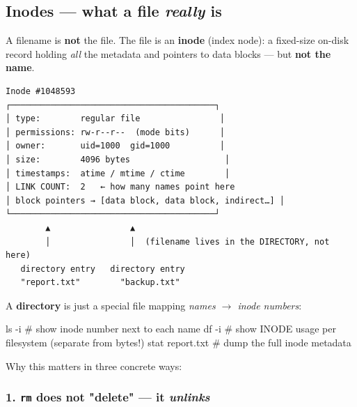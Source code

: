 \documentclass[11pt]{article}
\newenvironment{Shaded}{\begin{snugshade}}{\end{snugshade}}
\newcommand{\AttributeTok}[1]{\textcolor[rgb]{0.16,0.50,0.73}{#1}}
\newcommand{\CommentTok}[1]{\textcolor[rgb]{0.48,0.49,0.49}{#1}}
\newcommand{\FunctionTok}[1]{\textcolor[rgb]{0.56,0.27,0.68}{#1}}
\newcommand{\NormalTok}[1]{\textcolor[rgb]{0.81,0.81,0.76}{#1}}
\begin{document}
\subsection{\texorpdfstring{Inodes --- what a file \emph{really} is}{Inodes --- what a file really is}}\label{inodes--what-a-file-really-is}

A filename is \textbf{not} the file. The file is an \textbf{inode} (index node): a fixed-size on-disk record holding \emph{all} the metadata and pointers to data blocks --- but \textbf{not the name}.

\setcodelang{}

\begin{verbatim}
Inode #1048593
┌─────────────────────────────────────────┐
│ type:        regular file                │
│ permissions: rw-r--r--  (mode bits)      │
│ owner:       uid=1000  gid=1000          │
│ size:        4096 bytes                   │
│ timestamps:  atime / mtime / ctime        │
│ LINK COUNT:  2   ← how many names point here
│ block pointers → [data block, data block, indirect…] │
└─────────────────────────────────────────┘
        ▲                ▲
        │                │  (filename lives in the DIRECTORY, not here)
   directory entry   directory entry
   "report.txt"        "backup.txt"
\end{verbatim}

A \textbf{directory} is just a special file mapping \emph{names \(\rightarrow\) inode numbers}:


\begin{Shaded}
\begin{Highlighting}[]
\FunctionTok{ls} \AttributeTok{{-}i}                 \CommentTok{\# show inode number next to each name}
\FunctionTok{df} \AttributeTok{{-}i}                 \CommentTok{\# show INODE usage per filesystem (separate from bytes!)}
\FunctionTok{stat}\NormalTok{ report.txt       }\CommentTok{\# dump the full inode metadata}
\end{Highlighting}
\end{Shaded}

Why this matters in three concrete ways:

\subsubsection{\texorpdfstring{1. \texttt{rm} does not "delete" --- it \emph{unlinks}}{1. rm does not "delete" --- it unlinks}}\label{1-rm-does-not-delete--it-unlinks}
\end{document}

